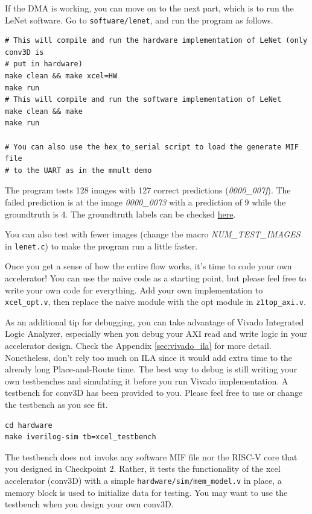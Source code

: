 \documentclass[11pt]{article}
\begin{document}
If the DMA is working, you can move on to the next part, which is to run the LeNet software. Go to \verb|software/lenet|, and run the program as follows.

\begin{verbatim}
# This will compile and run the hardware implementation of LeNet (only conv3D is
# put in hardware)
make clean && make xcel=HW
make run
# This will compile and run the software implementation of LeNet
make clean && make
make run

# You can also use the hex_to_serial script to load the generate MIF file
# to the UART as in the mmult demo
\end{verbatim}

The program tests 128 images with 127 correct predictions (\textit{0000\_007f}).
The failed prediction is at the image \textit{0000\_0073} with a prediction of 9
while the groundtruth is 4. The groundtruth labels can be checked \href{https://github.com/EECS150/arm_baremetal_app/blob/main/system/src/labels.h}{here}.

You can also test with fewer images (change the macro \textit{NUM\_TEST\_IMAGES} in \verb|lenet.c|) to make the program run a little faster.

Once you get a sense of how the entire flow works, it's time to code your own accelerator!
You can use the naive code as a starting point, but please feel free to write your own code for everything.
Add your own implementation to \verb|xcel_opt.v|, then replace the naive module with the opt module
in \verb|z1top_axi.v|.

As an additional tip for debugging, you can take advantage of Vivado Integrated Logic Analyzer, especially when you debug your AXI read and write logic in your accelerator design. Check the Appendix \ref{sec:vivado_ila} for more detail. Nonetheless, don't rely too much on ILA since it would add extra time to the already long Place-and-Route time. The best way to debug is still writing your own testbenches and simulating it before you run Vivado implementation. A testbench for conv3D has been provided to you. Please feel free to use or change the testbench as you see fit.

\begin{verbatim}
cd hardware
make iverilog-sim tb=xcel_testbench
\end{verbatim}

The testbench does not invoke any software MIF file nor the RISC-V core that you designed in Checkpoint 2. Rather, it tests the functionality of the xcel accelerator (conv3D) with a simple \verb|hardware/sim/mem_model.v| in place, a memory block is used to initialize data for testing. You may want to use the testbench when you design your own conv3D.
\end{document}
